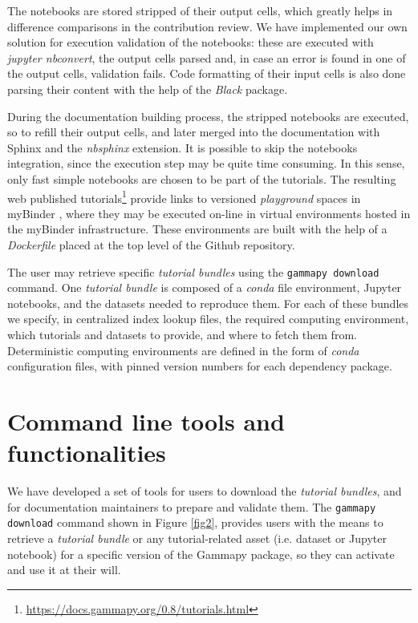 \documentclass[11pt,twoside]{article}
\begin{document}
The notebooks are stored stripped of their output cells, which greatly helps in difference comparisons in the contribution review. We have implemented our own solution for execution validation of the notebooks: these are executed with \textit{jupyter nbconvert}, the output cells parsed and, in case an error is found in one of the output cells, validation fails. Code formatting of their input cells is also done parsing their content with the help of the \textit{Black} package.

During the documentation building process, the stripped notebooks are executed, so to refill their output cells, and later merged into the documentation with Sphinx and the \textit{nbsphinx} extension. It is possible to skip the notebooks integration, since the execution step may be quite time consuming. In this sense, only fast simple notebooks are chosen to be part of the tutorials. The resulting web published tutorials\footnote{\url{https://docs.gammapy.org/0.8/tutorials.html}} provide links to versioned \textit{playground} spaces in myBinder \citep{project_jupyter-proc-scipy-2018}, where they may be executed on-line in virtual environments hosted in the myBinder infrastructure. These environments are built with the help of a \textit{Dockerfile} placed at the top level of the Github repository. 

The user may retrieve specific \textit{tutorial bundles} using the {\tt gammapy download} command. One \textit{tutorial bundle} is composed of a \textit{conda} file environment, Jupyter notebooks, and the datasets needed to reproduce them. For each of these bundles we specify, in centralized index lookup files, the required computing environment, which tutorials and datasets to provide, and where to fetch them from. Deterministic computing environments are defined in the form of \textit{conda} configuration files, with pinned version numbers for each dependency package. 

\section{Command line tools and functionalities}

We have developed a set of tools for users to download the \textit{tutorial bundles}, and for documentation maintainers to prepare and validate them. The {\tt gammapy download} command shown in Figure \ref{fig2}, provides users with the means to retrieve a \textit{tutorial bundle} or any tutorial-related asset (i.e. dataset or Jupyter notebook) for a specific version of the Gammapy package, so they can activate and use it at their will.
\end{document}
